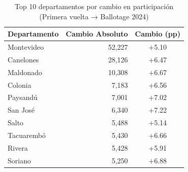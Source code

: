 \begin{table}
\caption{Top 10 departamentos por cambio en participación (Primera vuelta → Ballotage 2024)}
\label{tab:turnout_dept_top10}
\begin{tabular}{lrc}
\toprule
Departamento & Cambio Absoluto & Cambio (pp) \\
\midrule
Montevideo & 52,227 & +5.10 \\
Canelones & 28,126 & +6.47 \\
Maldonado & 10,308 & +6.67 \\
Colonia & 7,183 & +6.56 \\
Paysandú & 7,001 & +7.02 \\
San José & 6,340 & +7.22 \\
Salto & 5,488 & +5.14 \\
Tacuarembó & 5,430 & +6.66 \\
Rivera & 5,428 & +5.91 \\
Soriano & 5,250 & +6.88 \\
\bottomrule
\end{tabular}
\end{table}
